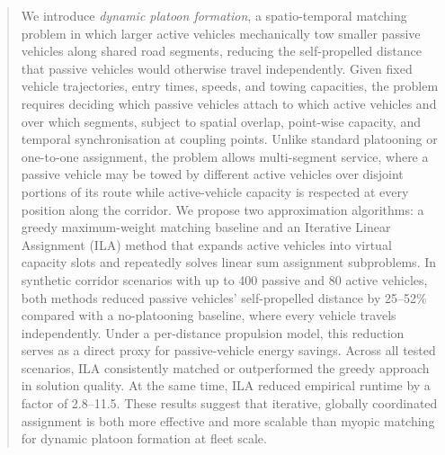 \documentclass[sigconf]{acmart}
\begin{document}
\begin{abstract}

We introduce \emph{dynamic platoon formation}, a spatio-temporal
matching problem in which larger active vehicles mechanically tow
smaller passive vehicles along shared road segments, reducing the
self-propelled distance that passive vehicles would otherwise travel
independently. Given fixed vehicle trajectories, entry times, speeds,
and towing capacities, the problem requires deciding which passive
vehicles attach to which active vehicles and over which segments,
subject to spatial overlap, point-wise capacity, and temporal
synchronisation at coupling points. Unlike standard platooning or
one-to-one assignment, the problem allows multi-segment service, where
a passive vehicle may be towed by different active vehicles over
disjoint portions of its route while active-vehicle capacity is
respected at every position along the corridor. We propose two
approximation algorithms: a greedy maximum-weight matching baseline
and an Iterative Linear Assignment (ILA) method that expands active
vehicles into virtual capacity slots and repeatedly solves linear sum
assignment subproblems. In synthetic corridor scenarios with up to 400 passive and 80 active vehicles, both methods reduced passive vehicles' self-propelled distance by 25--52\% compared with a no-platooning baseline, where every vehicle travels independently. Under a per-distance propulsion model, this reduction serves as a direct proxy for passive-vehicle energy savings. Across all tested scenarios, ILA consistently matched or outperformed the greedy approach in solution quality. At the same time, ILA reduced empirical runtime by a factor of 2.8--11.5. These results suggest that iterative, globally coordinated assignment is both more effective and more scalable than myopic matching for dynamic platoon formation at fleet scale.


\end{abstract}
\end{document}
